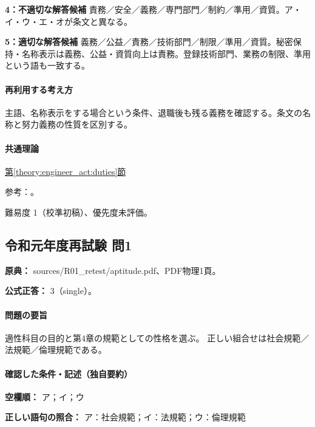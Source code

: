 \noindent\textbf{4：不適切な解答候補} 責務／安全／義務／専門部門／制約／準用／資質。ア・イ・ウ・エ・オが条文と異なる。\par

\noindent\textbf{5：適切な解答候補} 義務／公益／責務／技術部門／制限／準用／資質。秘密保持・名称表示は義務、公益・資質向上は責務。登録技術部門、業務の制限、準用という語も一致する。\par

\paragraph{再利用する考え方} 主語、名称表示をする場合という条件、退職後も残る義務を確認する。条文の名称と努力義務の性質を区別する。

\paragraph{共通理論} \hyperref[theory:engineer_act:duties]{第\ref*{theory:engineer_act:duties}節}

\par 参考：\cite{engineer_act_current}。

\par 難易度 1（校準初稿）、優先度未評価。

\subsection{令和元年度再試験 問1}
\label{q:r01-ret-apt-01}

\noindent\textbf{原典：} sources/R01\_retest/aptitude.pdf、PDF物理1頁。

\textbf{公式正答：} 3（single）。

\paragraph{問題の要旨} 適性科目の目的と第4章の規範としての性格を選ぶ。 正しい組合せは社会規範／法規範／倫理規範である。

\paragraph{確認した条件・記述（独自要約）}\mbox{}\par

\noindent\textbf{空欄順：} ア；イ；ウ\par

\noindent\textbf{正しい語句の照合：} ア：社会規範；イ：法規範；ウ：倫理規範\par

